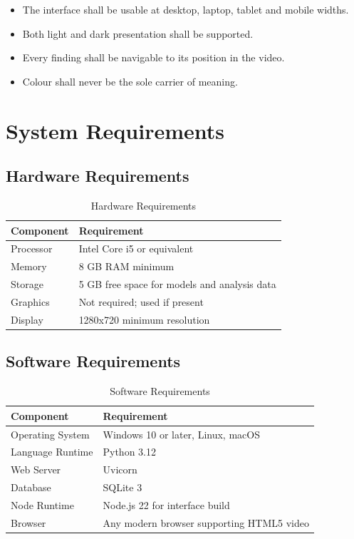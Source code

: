 \documentclass[12pt,a4paper,twoside]{report}
\begin{document}
\begin{itemize}
\item The interface shall be usable at desktop, laptop, tablet and mobile widths.
\item Both light and dark presentation shall be supported.
\item Every finding shall be navigable to its position in the video.
\item Colour shall never be the sole carrier of meaning.
\end{itemize}

\section{System Requirements}

\subsection{Hardware Requirements}

\begin{table}[h]
\centering
\begin{tabular}{|p{5cm}|p{7cm}|}
\hline
\textbf{Component} & \textbf{Requirement} \\
\hline
Processor & Intel Core i5 or equivalent \\
\hline
Memory & 8 GB RAM minimum \\
\hline
Storage & 5 GB free space for models and analysis data \\
\hline
Graphics & Not required; used if present \\
\hline
Display & 1280x720 minimum resolution \\
\hline
\end{tabular}
\caption{Hardware Requirements}
\end{table}

\subsection{Software Requirements}

\begin{table}[h]
\centering
\begin{tabular}{|p{5cm}|p{7cm}|}
\hline
\textbf{Component} & \textbf{Requirement} \\
\hline
Operating System & Windows 10 or later, Linux, macOS \\
\hline
Language Runtime & Python 3.12 \\
\hline
Web Server & Uvicorn \\
\hline
Database & SQLite 3 \\
\hline
Node Runtime & Node.js 22 for interface build \\
\hline
Browser & Any modern browser supporting HTML5 video \\
\hline
\end{tabular}
\caption{Software Requirements}
\end{table}
\end{document}

